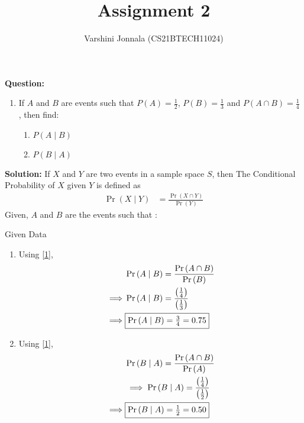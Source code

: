 \documentclass[journal,12pt,twocolumn]{IEEEtran}
\title{Assignment 2}
\author{Varshini Jonnala (CS21BTECH11024)}
\providecommand{\pr}[1]{\ensuremath{\Pr\left(#1\right)}}
\providecommand{\brak}[1]{\ensuremath{\left(#1\right)}}
\newcommand{\question}{\noindent \textbf{Question: }}
\newcommand{\solution}{\noindent \textbf{Solution: }}
\begin{document}
    \maketitle
    
    \question
    \begin{enumerate}[label=]
        \item  If $A$ and $B$ are events such that $P(A) = \frac{1}{2}$, $P(B)= \frac{1}{3}$ and $P(A \cap B)= \frac{1}{4}$ , then find:
    \begin{enumerate}
        \item $P(A \mid B)$
        \item $P(B \mid A)$
    \end{enumerate}
    \end{enumerate}

    \solution 
     If $X$ and $Y$ are two events in a sample space $S$, then The Conditional Probability of $X$ given $Y$ is defined as
        \begin{align}
        \label{1}  \pr{X \mid Y} &= \frac{\pr{X \cap Y}}{\pr{Y}}  
        \end{align}
        Given, $A$ and $B$ are the events such that :
        \begin{table}[ht!]
            
        \caption{Given Data}
	        \label{Tables:Table}
        \end{table}
        \begin{enumerate}
            \item Using \eqref{1},
            \begin{align}
                &\pr{A \mid B} = \frac{\pr{A \cap B}}{\pr{B}}\\
                \implies &\pr{A \mid B} = {\frac{\brak{\frac{1}{4}}}{\brak{\frac{1}{3}}}}\\
                \implies &\fbox{$\pr{A \mid B} =\frac{3}{4} = 0.75$}
            \end{align}
            
            \item Using \eqref{1},
                \begin{align}
                &\pr{B \mid A} = \frac{\pr{A \cap B}}{\pr{A}}\\
                &\implies \pr{B \mid A} = {\frac{\brak{\frac{1}{4}}}{\brak{\frac{1}{2}}}}\\
                \implies &\fbox{$\pr{B \mid A} = \frac{1}{2} = 0.50$}
            \end{align} 
        \end{enumerate}
    
\end{document}
